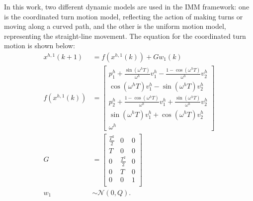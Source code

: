 \documentclass[letterpaper, 10 pt, conference]{ieeeconf}
\begin{document}
	In this work, two different dynamic models are used in the IMM framework: one is the coordinated turn motion model, reflecting the action of making turns or moving along a curved path, and the other is the uniform motion model, representing the straight-line movement. 
	The equation for the coordinated turn motion is shown below:
	\begin{subequations}
		\begin{align*}
			x^{h,1}(k+1)&= f(x^{h,1}(k))+Gw_1(k) \\ 
			f(x^{h,1}(k))&=\left[
			\begin{array}{c}
				p^h_1+\frac{\sin(\omega^h T)}{\omega^h}v^h_1-\frac{1-\cos(\omega^h T)}{\omega^h}v^h_2\\
				\cos(\omega^h T)v^h_1-\sin(\omega^h T)v^h_2\\
				p^h_2+\frac{1-\cos(\omega^h T)}{\omega^h}v^h_1+\frac{\sin(\omega^h T)}{\omega^h}v^h_2\\
				\sin(\omega^h T)v^h_1+\cos(\omega^h T)v^h_2\\
				\omega^h 
			\end{array}\right] \\
			G &= \left[
			\begin{array}{ccc}
				\frac{T^2}{2}& 0& 0\\
				T& 0& 0\\
				0& \frac{T^2}{2}& 0\\
				0& T& 0\\
				0& 0& 1\\
			\end{array}\right] \\
			w_1&\sim\mathcal{N}(0,Q).
		\end{align*}
	\end{subequations}
	
\end{document}
